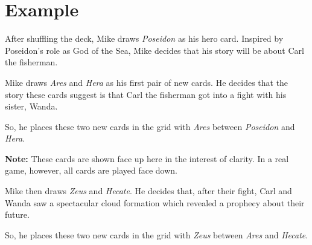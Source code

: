 \section*{Example}

After shuffling the deck, Mike draws \emph{Poseidon} as his hero card.
Inspired by Poseidon's role as God of the Sea, Mike decides that his story will be about Carl the fisherman.

Mike draws \emph{Ares} and \emph{Hera} as his first pair of new cards.
He decides that the story these cards suggest is that Carl the fisherman got into a fight with his sister, Wanda. 

So, he places these two new cards in the grid with \emph{Ares} between \emph{Poseidon} and \emph{Hera}.
\begin{center}
\end{center}
\textbf{Note:} These cards are shown face up here in the interest of clarity. In a real game, however, all cards are played face down.

\newpage

Mike then draws \emph{Zeus} and \emph{Hecate}.
He decides that, after their fight, Carl and Wanda saw a spectacular cloud formation which revealed a prophecy about their future.

So, he places these two new cards in the grid with \emph{Zeus} between \emph{Ares} and \emph{Hecate}.

